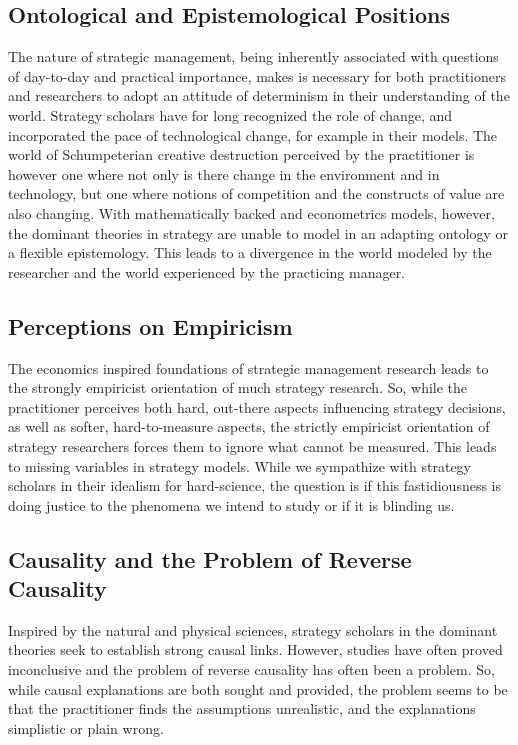 \documentclass[12pt]{article}
\begin{document}
\subsection{Ontological and Epistemological Positions}
The nature of strategic management, being inherently associated with questions of day-to-day and practical importance, makes is necessary for both practitioners and researchers to adopt an attitude of determinism in their understanding of the world. Strategy scholars have for long recognized the role of change, and incorporated the pace of technological change, for example in their models. The world of Schumpeterian creative destruction perceived by the practitioner is however one where not only is there change in the environment and in technology, but one where notions of competition and the constructs of value are also changing. With mathematically backed and econometrics models, however, the dominant theories in strategy are unable to model in an adapting ontology or a flexible epistemology. This leads to a divergence in the world modeled by the researcher and the world experienced by the practicing manager.

\subsection{Perceptions on Empiricism}
The economics inspired foundations of strategic management research leads to the strongly empiricist orientation of much strategy research. So, while the practitioner perceives both hard, out-there aspects influencing strategy decisions, as well as softer, hard-to-measure aspects, the strictly empiricist orientation of strategy researchers forces them to ignore what cannot be measured. This leads to missing variables in strategy models. While we sympathize with strategy scholars in their idealism for hard-science, the question is if this fastidiousness is doing justice to the phenomena we intend to study or if it is blinding us.

\subsection{Causality and the Problem of Reverse Causality}
Inspired by the natural and physical sciences, strategy scholars in the dominant theories seek to establish strong causal links. However, studies have often proved inconclusive and the problem of reverse causality has often been a problem. So, while causal explanations are both sought and provided, the problem seems to be that the practitioner finds  the assumptions unrealistic, and the explanations simplistic or plain wrong.
\end{document}
